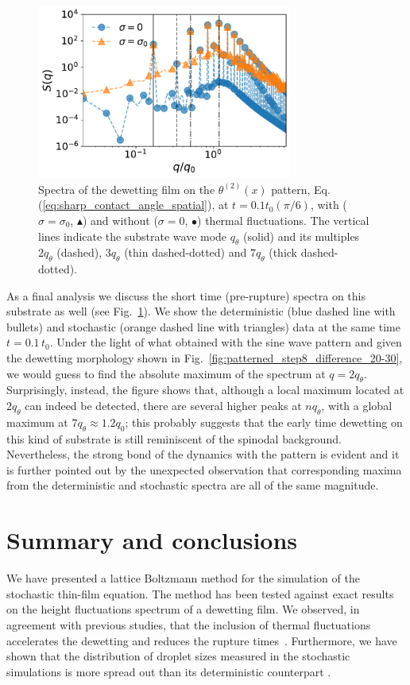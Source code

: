  \begin{figure}
     \centering
     \includegraphics[width=0.75\textwidth]{graphics/square_wave_det_stoch.pdf}
     \caption{Spectra of the dewetting film on the $\theta^{(2)}(x)$ pattern, Eq.(\ref{eq:sharp_contact_angle_spatial}), at $t = 0.1t_0(\pi/6)$, with ($\sigma = \sigma_0$, \textcolor{pyorange}{$\blacktriangle$}) and without ($\sigma =0$, \textcolor{pyblue}{$\bullet$}) thermal fluctuations. 
     The vertical lines indicate the substrate wave mode $q_{\theta}$ (solid) and its multiples $2q_{\theta}$ (dashed), $3q_{\theta}$ (thin dashed-dotted) and $7q_{\theta}$ (thick dashed-dotted).}
     \label{fig:square_wave_both}
 \end{figure}
As a final analysis we discuss the short time (pre-rupture) spectra on this substrate as well (see Fig.~\ref{fig:square_wave_both}).
We show the deterministic (blue dashed line with bullets) and stochastic (orange dashed line with triangles) data at the same time $t=0.1\,t_0$.
Under the light of what obtained with the sine wave pattern and given the dewetting morphology shown in Fig.~\ref{fig:patterned_step8_difference_20-30}, we would guess to find the absolute maximum of the spectrum at $q=2 q_{\theta}$.
Surprisingly, instead, the figure shows that, although a local maximum located at $2q_{\theta}$ can indeed be detected, there are several higher peaks at $n q_{\theta}$, with a global maximum at $7q_{\theta} \approx 1.2 q_0$; this probably suggests that the early time dewetting on this kind of substrate is still reminiscent of the spinodal background. 
Nevertheless, the strong bond of the dynamics with the pattern is evident and it is further pointed out by the unexpected observation that corresponding maxima from the deterministic and stochastic spectra are all of the same magnitude.

\section{Summary and conclusions}\label{sec:sum_conclu}
We have presented a lattice Boltzmann method for the simulation of the stochastic thin-film equation. 
The method has been tested against exact results on the height fluctuations spectrum of a dewetting film.  
We observed, in agreement with previous studies, that the inclusion of thermal fluctuations accelerates the dewetting and reduces the rupture times~\cite{grunThinFilmFlowInfluenced2006}.
Furthermore, we have shown that the distribution of droplet sizes measured in the stochastic simulations is more spread out than its deterministic counterpart \cite{nesicFullyNonlinearDynamics2015}. 

